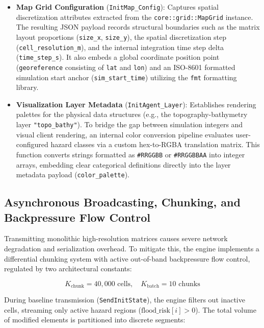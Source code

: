 \begin{itemize}
    \item \textbf{Map Grid Configuration} (\texttt{InitMap\_Config}): Captures spatial discretization attributes extracted from the 
    \texttt{core::grid::MapGrid} instance. The resulting JSON payload records structural boundaries such as the matrix layout 
    proportions (\texttt{size\_x}, \texttt{size\_y}), the spatial discretization step (\texttt{cell\_resolution\_m}), and the internal 
    integration time step delta (\texttt{time\_step\_s}). It also embeds a global coordinate position point (\texttt{georeference} 
    consisting of \texttt{lat} and \texttt{lon}) and an ISO-8601 formatted simulation start anchor (\texttt{sim\_start\_time}) utilizing 
    the \texttt{fmt} formatting library.
    
    \item \textbf{Visualization Layer Metadata} (\texttt{InitAgent\_Layer}): Establishes rendering palettes for the physical data 
    structures (e.g., the topography-bathymetry layer \texttt{"topo\_bathy"}). To bridge the gap between simulation integers and 
    visual client rendering, an internal color conversion pipeline evaluates user-configured hazard classes via a custom hex-to-RGBA 
    translation matrix. This function converts strings formatted as \texttt{\#RRGGBB} or \texttt{\#RRGGBBAA} into integer arrays, embedding clear categorical 
definitions directly into the layer metadata payload (\texttt{color\_palette}).
\end{itemize}


\subsection{Asynchronous Broadcasting, Chunking, and Backpressure Flow Control}
\label{subsec:broadcasting_chunking_backpressure}

Transmitting monolithic high-resolution matrices causes severe network degradation and serialization overhead. To mitigate this, the engine implements a differential chunking system with active out-of-band backpressure flow control, regulated by two architectural constants:

\begin{equation}
    K_{\text{chunk}} = 40,000 \text{ cells}, \quad K_{\text{batch}} = 10 \text{ chunks}
\end{equation}

During baseline transmission (\texttt{SendInitState}), the engine filters out inactive cells, streaming only active hazard regions ($\text{flood\_risk}[i] > 0$). The total volume of modified elements is partitioned into discrete segments:

